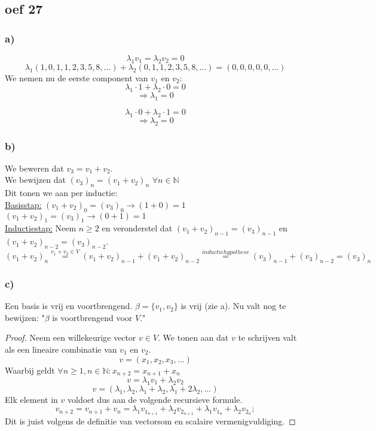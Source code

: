\documentclass[lineaire_algebra_oplossingen.tex]{subfiles}
\begin{document}
\subsection*{oef 27}
\subsubsection*{a)}
$$\lambda_1 v_1 = \lambda_2 v_2 = 0$$
$$\lambda_1(1,0,1,1,2,3,5,8,...) + \lambda_2(0,1,1,2,3,5,8,...)=(0,0,0,0,0,...)$$
We nemen nu de eerste component van $v_1$ en $v_2$:
$$\lambda_1 \cdot 1 + \lambda_2 \cdot 0 = 0$$
$$\Rightarrow \lambda_1 = 0$$

$$\lambda_1 \cdot 0 + \lambda_2 \cdot 1 = 0$$
$$\Rightarrow \lambda_2 = 0$$
\subsubsection*{b)}
We beweren dat $v_3 = v_1 + v_2$.\\
We bewijzen dat $(v_3)_n = (v_1 + v_2)_n$ \hspace{5pt} $\forall n \in \mathbb{N}$\\
Dit tonen we aan per inductie:\\
\underline{Basisstap:} $(v_1 + v_2)_0 = (v_3)_0 \rightarrow (1 + 0) = 1$\\
\hspace*{4.5em} $(v_1 + v_2)_1 = (v_3)_1 \rightarrow (0 + 1) = 1$\\
\underline{Inductiestap:} Neem $n \geq 2$ en veronderstel dat $(v_1 + v_2)_{n-1} = (v_3)_{n-1}$ en $(v_1 + v_2)_{n-2} = (v_3)_{n-2}$.\\
\[
(v_1 + v_2)_n \overset{v_1 + v_2 \in V}{=} (v_1 + v_2)_{n-1} + (v_1 + v_2)_{n-2} \overset{inductiehypothese}{=} (v_3)_{n-1} + (v_3)_{n-2} = (v_3)_n
\]
\subsubsection*{c)}
Een basis is vrij en voortbrengend. $\beta = \{v_1,v_2\}$ is vrij (zie a).
Nu valt nog te bewijzen: "$\beta$ is voortbrengend voor $V$."
\begin{proof}
Neem een willekeurige vector $v \in V$. We tonen aan dat $v$ te schrijven valt als een lineaire combinatie van $v_1$ en $v_2$.
\[
v=(x_1,x_2,x_3,...)
\]
Waarbij geldt $\forall n \ge 1, n \in \mathbb{N}: x_{n+2}=x_{n+1}+x_n$
\[
v = \lambda_1v_1 + \lambda_2v_2
\]
\[
v = (\lambda_1,\lambda_2,\lambda_1+\lambda_2,\lambda_1+2\lambda_2,...)
\]
Elk element in $v$ voldoet dus aan de volgende recursieve formule.
\[
v_{n+2} = v_{n+1}+v_n=\lambda_1v_{1_{n+1}}+\lambda_2v_{2_{n+1}} + \lambda_1v_{1_{n}}+\lambda_2v_{2_{n}};
\]
Dit is juist volgens de definitie van vectorsom en scalaire vermenigvuldiging.
\end{proof}
\end{document}
